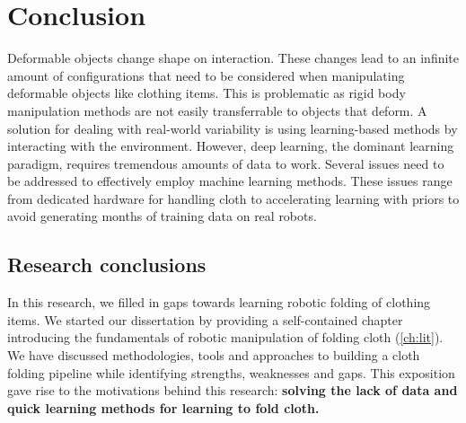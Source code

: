 \documentclass[\home/main.tex]{subfiles}
\begin{document}

\chapter{Conclusion}\label{ch:conclusion}

Deformable objects change shape on interaction. These changes lead to an infinite amount of configurations that need to be considered when manipulating deformable objects like clothing items. This is problematic as rigid body manipulation methods are not easily transferrable to objects that deform.
A solution for dealing with real-world variability is using learning-based methods by interacting with the environment. However, deep learning, the dominant learning paradigm, requires tremendous amounts of data to work. Several issues need to be addressed to effectively employ machine learning methods. These issues range from dedicated hardware for handling cloth to accelerating learning with priors to avoid generating months of training data on real robots.

\section{Research conclusions} \label{sec:conc_research}
In this research, we filled in gaps towards learning robotic folding of clothing items.
We started our dissertation by providing a self-contained chapter introducing the fundamentals of robotic manipulation of folding cloth (\cref{ch:lit}). We have discussed methodologies, tools and approaches to building a cloth folding pipeline while identifying strengths, weaknesses and gaps. This exposition gave rise to the motivations behind this research: \textbf{solving the lack of data and quick learning methods for learning to fold cloth.}
\end{document}
